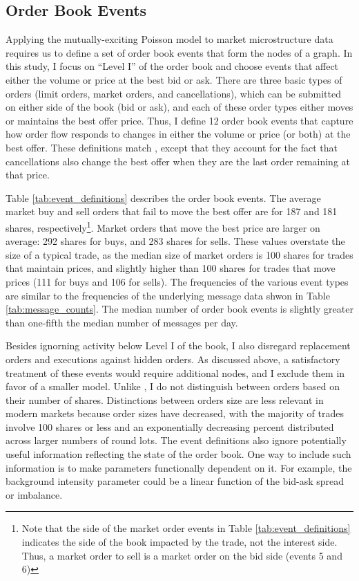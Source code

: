 	\subsection{Order Book Events}
		Applying the mutually-exciting Poisson model to market microstructure data requires us to define a set of order book events that form the nodes of a graph. In this study, I focus on ``Level I'' of the order book and choose events that affect either the volume or price at the best bid or ask. There are three basic types of orders (limit orders, market orders, and cancellations), which can be submitted on either side of the book (bid or ask), and each of these order types either moves or maintains the best offer price. Thus, I define 12 order book events that capture how order flow responds to changes in either the volume or price (or both) at the best offer. These definitions match \cite{Large2007}, except that they account for the fact that cancellations also change the best offer when they are the last order remaining at that price.

		Table \ref{tab:event_definitions} describes the order book events. The average market buy and sell orders that fail to move the best offer are for 187 and 181 shares, respectively\footnote{Note that the side of the market order events in Table \ref{tab:event_definitions} indicates the side of the book impacted by the trade, not the interest side. Thus, a market order to sell is a market order on the bid side (events 5 and 6)}. Market orders that move the best price are larger on average: 292 shares for buys, and 283 shares for sells. These values overstate the size of a typical trade, as the median size of market orders is 100 shares for trades that maintain prices, and slightly higher than 100 shares for trades that move prices (111 for buys and 106 for sells). The frequencies of the various event types are similar to the frequencies of the underlying message data shwon in Table \ref{tab:message_counts}. The median number of order book events is slightly greater than one-fifth the median number of messages per day.

		Besides ignorning activity below Level I of the book, I also disregard replacement orders and executions against hidden orders. As discussed above, a satisfactory treatment of these events would require additional nodes, and I exclude them in favor of a smaller model. Unlike \cite{Biais1995}, I do not distinguish between orders based on their number of shares. Distinctions between orders size are less relevant in modern markets because order sizes have decreased, with the majority of trades involve 100 shares or less and an exponentially decreasing percent distributed across larger numbers of round lots. The event definitions also ignore potentially useful information reflecting the state of the order book. One way to include such information is to make parameters functionally dependent on it. For example, the background intensity parameter could be a linear function of the bid-ask spread or imbalance.

